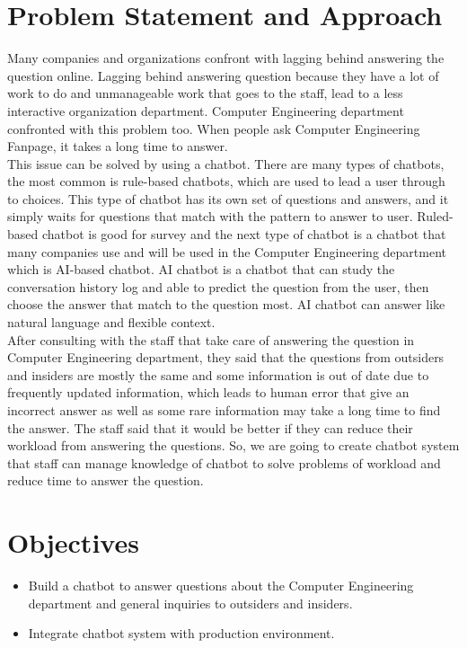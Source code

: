 \documentclass[12pt,oneside,openright,a4paper]{cpe-english-project}
\begin{document}
\section{Problem Statement and Approach} 
Many companies and organizations confront with lagging behind answering the question online. Lagging behind answering question because they have a lot of work to do and unmanageable work that goes to the staff, lead to a less interactive organization department. Computer Engineering department confronted with this problem too. When people ask Computer Engineering Fanpage, it takes a long time to answer.\\
This issue can be solved by using a chatbot. There are many types of chatbots, the most common is rule-based chatbots, which are used to lead a user through to choices. This type of chatbot has its own set of questions and answers, and it simply waits for questions that match with the pattern to answer to user. Ruled-based chatbot is good for survey and the next type of chatbot is a chatbot that many companies use and will be used in the Computer Engineering department which is AI-based chatbot. AI chatbot is a chatbot that can study the conversation history log and able to predict the question from the user, then choose the answer that match to the question most. AI chatbot can answer like natural language and flexible context.\\
After consulting with the staff that take care of answering the question in Computer Engineering department, they said that the questions from outsiders and insiders are mostly the same and some information is out of date due to frequently updated information, which leads to human error that give an incorrect answer as well as some rare information may take a long time to find
the answer. The staff said that it would be better if they can reduce their workload from answering the questions. So, we are going to create chatbot system that staff can manage knowledge of chatbot to solve problems of workload and reduce time to answer the question.

\section{Objectives}
\begin{itemize}
\item  Build a chatbot to answer questions about the Computer Engineering department and general inquiries to outsiders and insiders.
\item  Integrate chatbot system with production environment.
\end{itemize}
\end{document}
